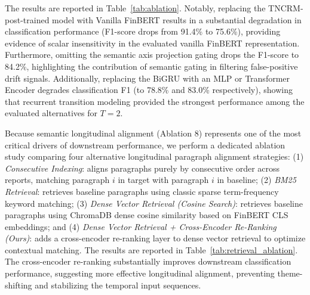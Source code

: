\documentclass[journal]{IEEEtran}
\begin{document}
The results are reported in Table~\ref{tab:ablation}. Notably, replacing the TNCRM-post-trained model with Vanilla FinBERT results in a substantial degradation in classification performance (F1-score drops from 91.4\% to 75.6\%), providing evidence of scalar insensitivity in the evaluated vanilla FinBERT representation. Furthermore, omitting the semantic axis projection gating drops the F1-score to 84.2\%, highlighting the contribution of semantic gating in filtering false-positive drift signals. Additionally, replacing the BiGRU with an MLP or Transformer Encoder degrades classification F1 (to 78.8\% and 83.0\% respectively), showing that recurrent transition modeling provided the strongest performance among the evaluated alternatives for $T=2$.

\begin{table}[h]
\centering
\caption{Ablation Study Results of Architectural Components}
\label{tab:ablation}
\end{table}

Because semantic longitudinal alignment (Ablation 8) represents one of the most critical drivers of downstream performance, we perform a dedicated ablation study comparing four alternative longitudinal paragraph alignment strategies: (1) \textit{Consecutive Indexing}: aligns paragraphs purely by consecutive order across reports, matching paragraph $i$ in target with paragraph $i$ in baseline; (2) \textit{BM25 Retrieval}: retrieves baseline paragraphs using classic sparse term-frequency keyword matching; (3) \textit{Dense Vector Retrieval (Cosine Search)}: retrieves baseline paragraphs using ChromaDB dense cosine similarity based on FinBERT CLS embeddings; and (4) \textit{Dense Vector Retrieval + Cross-Encoder Re-Ranking (Ours)}: adds a cross-encoder re-ranking layer to dense vector retrieval to optimize contextual matching. The results are reported in Table~\ref{tab:retrieval_ablation}. The cross-encoder re-ranking substantially improves downstream classification performance, suggesting more effective longitudinal alignment, preventing theme-shifting and stabilizing the temporal input sequences.
\end{document}
